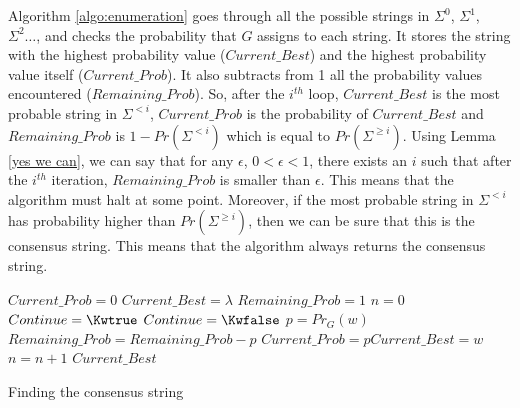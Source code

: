 \documentclass[submission]{eptcs} \usepackage{breakurl}             \usepackage[english]{babel}
\providecommand{\PCFG}{\ensuremath{\textsc{Pcfg}}}
\providecommand{\Prob}{\ensuremath{Pr}}
\begin{document}
Algorithm \ref{algo:enumeration} goes through all the possible strings in $\Sigma^0$, $\Sigma^1$, $\Sigma^2\ldots$, and checks the probability that $G$ assigns to each string. It stores the string with the highest probability value ($Current\_Best$) and the highest probability value itself ($Current\_Prob$). It also subtracts from 1 all the probability values encountered ($Remaining\_Prob$). So, after the $i^{th}$ loop, $Current\_Best$ is the most probable string in $\Sigma^{<i}$, $Current\_Prob$ is the probability of $Current\_Best$ and $Remaining\_Prob$ is $1 - \Prob(\Sigma^{< i})$ which is equal to $\Prob(\Sigma^{\geq i})$. Using Lemma \ref{yes we can}, we can say that for any $\epsilon$, $0 < \epsilon < 1$, there exists an $i$ such that after the $i^{th}$ iteration, $Remaining\_Prob$ is smaller than $\epsilon$. This means that the algorithm must halt at some point. Moreover, if the most probable string in $\Sigma^{<i}$ has probability higher than $\Prob(\Sigma^{\geq i})$, then we can be sure that this is the consensus string. This means that the algorithm always returns the consensus string.  


\begin{algorithm}


  \KwData{ a $\PCFG$ $G$}
$Current\_Prob=0$\;
$Current\_Best=\lambda$\;
$Remaining\_Prob=1$\;
$n=0$\;
$Continue=\Kwtrue$\;
{  
   {$Continue=\Kwfalse$\;}
   \Else
   {
	{ $p = \Prob_{G}(w)$\;
      $Remaining\_Prob = Remaining\_Prob - p$\;
	    {$Current\_Prob=p$\;$Current\_Best=w$\;}
    }
    $n=n+1$\;
   }	  
}
\Return $Current\_Best$
\caption{Finding the consensus string}\label{algo:enumeration}
\end{algorithm}
\end{document}
